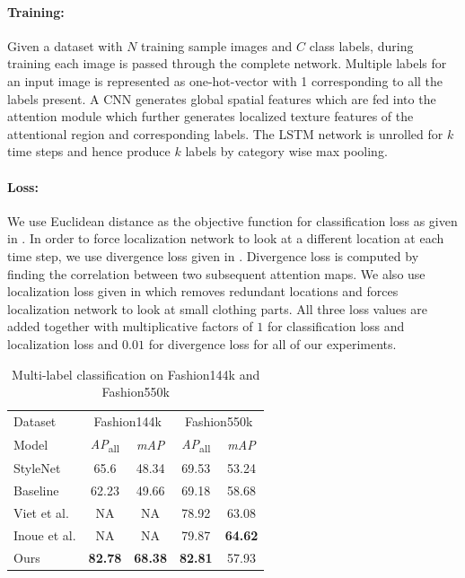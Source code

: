 \documentclass{article}
\begin{document}
\paragraph*{Training: }

Given a dataset with $N$ training sample images and $C$ class labels, during training each image is passed through the complete network. Multiple labels for an input image is represented as one-hot-vector with 1 corresponding to all the labels present. A CNN generates global spatial features which are fed into the attention module which further generates localized texture features of the attentional region and corresponding labels. The LSTM network is unrolled for $k$ time steps and hence produce $k$ labels by category wise max pooling.

\paragraph*{Loss: }

We use Euclidean distance as the objective function for classification loss as given in \cite{WangSTLSTMICCV2017}. In order to force localization network to look at a different location at each time step, we use divergence loss given in \cite{ZhaoToP2017}. Divergence loss is computed by finding the correlation between two subsequent attention maps. We also use localization loss given in \cite{WangSTLSTMICCV2017} which removes redundant locations and forces localization network to look at small clothing parts. All three loss values are added together with multiplicative factors of $1$ for classification loss and localization loss and $0.01$ for divergence loss for all of our experiments.

\begin{table}
\centering
\begin{tabular}{ l c c c c}
 \hline
Dataset & \multicolumn{2}{c}{Fashion144k \cite{SimoSerraCVPR2016}} & \multicolumn{2}{c}{Fashion550k \cite{InoueICCVW2017}} \\
Model & \textit{AP}\textsubscript{all} & \textit{mAP} & \textit{AP}\textsubscript{all} & \textit{mAP} \\
\hline
StyleNet \cite{SimoSerraCVPR2016} & 65.6 & 48.34 & 69.53 & 53.24 \\
Baseline \cite{InoueICCVW2017} & 62.23 & 49.66 & 69.18 & 58.68 \\
Viet et al. \cite{veit2017learning} & NA & NA & 78.92 & 63.08 \\
Inoue et al. \cite{InoueICCVW2017} & NA & NA & 79.87 & \textbf{64.62} \\
Ours  & \textbf{82.78} & \textbf{68.38} & \textbf{82.81} & 57.93 \\
 \hline
\end{tabular}
\caption{Multi-label classification on Fashion144k \cite{SimoSerraCVPR2016} and Fashion550k \cite{InoueICCVW2017}}
\label{table:multi-label}
\end{table}
\end{document}
